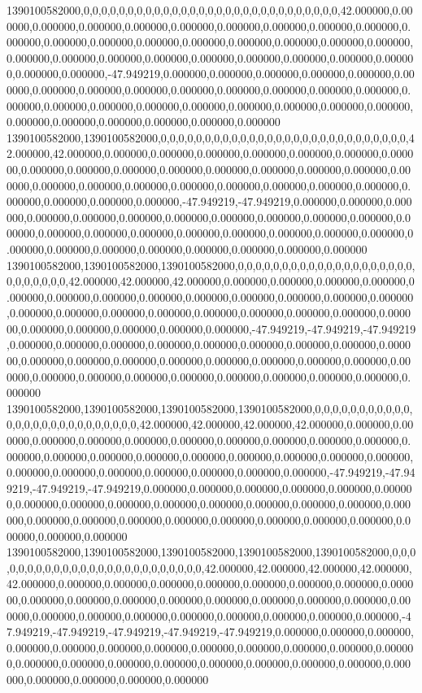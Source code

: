 1390100582000,0,0,0,0,0,0,0,0,0,0,0,0,0,0,0,0,0,0,0,0,0,0,0,0,0,0,0,0,0,42.000000,0.000000,0.000000,0.000000,0.000000,0.000000,0.000000,0.000000,0.000000,0.000000,0.000000,0.000000,0.000000,0.000000,0.000000,0.000000,0.000000,0.000000,0.000000,0.000000,0.000000,0.000000,0.000000,0.000000,0.000000,0.000000,0.000000,0.000000,0.000000,0.000000,-47.949219,0.000000,0.000000,0.000000,0.000000,0.000000,0.000000,0.000000,0.000000,0.000000,0.000000,0.000000,0.000000,0.000000,0.000000,0.000000,0.000000,0.000000,0.000000,0.000000,0.000000,0.000000,0.000000,0.000000,0.000000,0.000000,0.000000,0.000000,0.000000,0.000000
1390100582000,1390100582000,0,0,0,0,0,0,0,0,0,0,0,0,0,0,0,0,0,0,0,0,0,0,0,0,0,0,0,0,42.000000,42.000000,0.000000,0.000000,0.000000,0.000000,0.000000,0.000000,0.000000,0.000000,0.000000,0.000000,0.000000,0.000000,0.000000,0.000000,0.000000,0.000000,0.000000,0.000000,0.000000,0.000000,0.000000,0.000000,0.000000,0.000000,0.000000,0.000000,0.000000,0.000000,-47.949219,-47.949219,0.000000,0.000000,0.000000,0.000000,0.000000,0.000000,0.000000,0.000000,0.000000,0.000000,0.000000,0.000000,0.000000,0.000000,0.000000,0.000000,0.000000,0.000000,0.000000,0.000000,0.000000,0.000000,0.000000,0.000000,0.000000,0.000000,0.000000,0.000000
1390100582000,1390100582000,1390100582000,0,0,0,0,0,0,0,0,0,0,0,0,0,0,0,0,0,0,0,0,0,0,0,0,0,0,0,42.000000,42.000000,42.000000,0.000000,0.000000,0.000000,0.000000,0.000000,0.000000,0.000000,0.000000,0.000000,0.000000,0.000000,0.000000,0.000000,0.000000,0.000000,0.000000,0.000000,0.000000,0.000000,0.000000,0.000000,0.000000,0.000000,0.000000,0.000000,0.000000,0.000000,-47.949219,-47.949219,-47.949219,0.000000,0.000000,0.000000,0.000000,0.000000,0.000000,0.000000,0.000000,0.000000,0.000000,0.000000,0.000000,0.000000,0.000000,0.000000,0.000000,0.000000,0.000000,0.000000,0.000000,0.000000,0.000000,0.000000,0.000000,0.000000,0.000000,0.000000
1390100582000,1390100582000,1390100582000,1390100582000,0,0,0,0,0,0,0,0,0,0,0,0,0,0,0,0,0,0,0,0,0,0,0,0,0,0,42.000000,42.000000,42.000000,42.000000,0.000000,0.000000,0.000000,0.000000,0.000000,0.000000,0.000000,0.000000,0.000000,0.000000,0.000000,0.000000,0.000000,0.000000,0.000000,0.000000,0.000000,0.000000,0.000000,0.000000,0.000000,0.000000,0.000000,0.000000,0.000000,0.000000,-47.949219,-47.949219,-47.949219,-47.949219,0.000000,0.000000,0.000000,0.000000,0.000000,0.000000,0.000000,0.000000,0.000000,0.000000,0.000000,0.000000,0.000000,0.000000,0.000000,0.000000,0.000000,0.000000,0.000000,0.000000,0.000000,0.000000,0.000000,0.000000,0.000000,0.000000
1390100582000,1390100582000,1390100582000,1390100582000,1390100582000,0,0,0,0,0,0,0,0,0,0,0,0,0,0,0,0,0,0,0,0,0,0,0,0,0,42.000000,42.000000,42.000000,42.000000,42.000000,0.000000,0.000000,0.000000,0.000000,0.000000,0.000000,0.000000,0.000000,0.000000,0.000000,0.000000,0.000000,0.000000,0.000000,0.000000,0.000000,0.000000,0.000000,0.000000,0.000000,0.000000,0.000000,0.000000,0.000000,0.000000,-47.949219,-47.949219,-47.949219,-47.949219,-47.949219,0.000000,0.000000,0.000000,0.000000,0.000000,0.000000,0.000000,0.000000,0.000000,0.000000,0.000000,0.000000,0.000000,0.000000,0.000000,0.000000,0.000000,0.000000,0.000000,0.000000,0.000000,0.000000,0.000000,0.000000,0.000000
